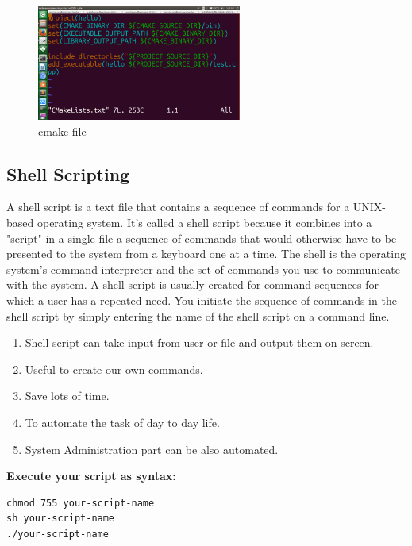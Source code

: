\begin{figure}[!ht]
\centering
\includegraphics[width=0.6\textwidth]{input/images/cgs/cm.png}                   
\caption{cmake file}
\hspace{-1.5em}
\end{figure}

\subsection{Shell Scripting}
A shell script is a text file that contains a sequence of commands for a UNIX-based operating system. It's called a shell script because it combines into a "script" in a single file a sequence of commands that would otherwise have to be presented to the system from a keyboard one at a time. The shell is the operating system's command interpreter and the set of commands you use to communicate with the system. A shell script is usually created for command sequences for which a user has a repeated need. You initiate the sequence of commands in the shell script by simply entering the name of the shell script on a command line.
\begin{enumerate}
\item Shell script can take input from user or file and output them on screen.
\item Useful to create our own commands.
\item Save lots of time.
\item To automate the task of day to day life.
\item System Administration part can be also automated.
\end{enumerate}
{ \bf Execute your script as syntax:}
\begin{verbatim}
chmod 755 your-script-name
sh your-script-name
./your-script-name
\end{verbatim}

